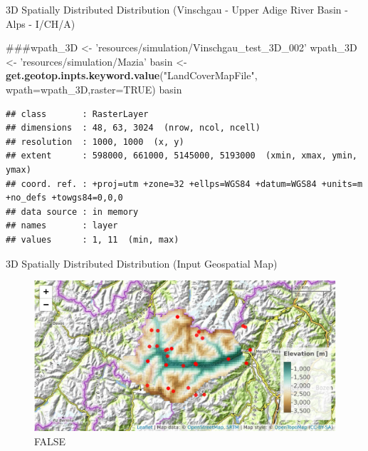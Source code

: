 \documentclass[ignorenonframetext,]{beamer}
\newenvironment{Shaded}{\begin{snugshade}}{\end{snugshade}}
\newcommand{\KeywordTok}[1]{\textcolor[rgb]{0.13,0.29,0.53}{\textbf{#1}}}
\newcommand{\DataTypeTok}[1]{\textcolor[rgb]{0.13,0.29,0.53}{#1}}
\newcommand{\StringTok}[1]{\textcolor[rgb]{0.31,0.60,0.02}{#1}}
\newcommand{\OtherTok}[1]{\textcolor[rgb]{0.56,0.35,0.01}{#1}}
\newcommand{\NormalTok}[1]{#1}
\begin{document}
\begin{frame}[fragile]{3D Spatially Distributed Distribution (Vinschgau
- Upper Adige River Basin - Alps - I/CH/A)}

\begin{Shaded}
\begin{Highlighting}[]
\NormalTok{###wpath_3D <- 'resources/simulation/Vinschgau_test_3D_002'}
\NormalTok{wpath_3D <-}\StringTok{ 'resources/simulation/Mazia'}
\NormalTok{basin <-}\StringTok{ }\KeywordTok{get.geotop.inpts.keyword.value}\NormalTok{(}\StringTok{"LandCoverMapFile"}\NormalTok{,}
              \DataTypeTok{wpath=}\NormalTok{wpath_3D,}\DataTypeTok{raster=}\OtherTok{TRUE}\NormalTok{)}
\NormalTok{basin}
\end{Highlighting}
\end{Shaded}

\begin{verbatim}
## class       : RasterLayer 
## dimensions  : 48, 63, 3024  (nrow, ncol, ncell)
## resolution  : 1000, 1000  (x, y)
## extent      : 598000, 661000, 5145000, 5193000  (xmin, xmax, ymin, ymax)
## coord. ref. : +proj=utm +zone=32 +ellps=WGS84 +datum=WGS84 +units=m +no_defs +towgs84=0,0,0 
## data source : in memory
## names       : layer 
## values      : 1, 11  (min, max)
\end{verbatim}

\end{frame}

\begin{frame}{3D Spatially Distributed Distribution (Input Geospatial
Map)}

\begin{figure}
\centering
\includegraphics{presentation_files/figure-beamer/unnamed-chunk-14-1.pdf}
\caption{FALSE}
\end{figure}

\end{frame}
\end{document}
